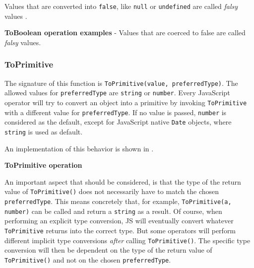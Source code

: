 Values that are converted into \texttt{false}, like \texttt{null} or \texttt{undefined} are called \textit{falsy} values \citep{you-dont-know-js}.

\begin{code}
	\captionsetup{aboveskip=0pt, belowskip=10pt}
	\caption[ToBoolean operation examples]{\textbf{ToBoolean operation examples} - Values that are coerced to false are called \textit{falsy} values.}
	\label{code:background-to-boolean-operation}
\end{code}

\subsubsection{ToPrimitive}
The signature of this function is \texttt{ToPrimitive(value, preferredType)}. The allowed values for \texttt{preferredType} are \texttt{string} or \texttt{number}. Every JavaScript operator will try to convert an object into a primitive by invoking \texttt{ToPrimitive} with a different value for \texttt{preferredType}. If no value is passed, \texttt{number} is considered as the default, except for JavaScript native \texttt{Date} objects, where \texttt{string} is used as default.

An implementation of this behavior is shown in .

\begin{code}
	\captionsetup{aboveskip=0pt, belowskip=10pt}
	\caption[ToPrimitive operation]{\textbf{ToPrimitive operation}}
	\label{code:background-to-primitive-operation}
\end{code}

An important aspect that should be considered, is that the type of the return value of \texttt{ToPrimitive()} does not necessarily have to match the chosen \texttt{preferredType}. This means concretely that, for example, \texttt{ToPrimitive(a, number)} can be called and return a \texttt{string} as a result. Of course, when performing an explicit type conversion, JS will eventually convert whatever \texttt{ToPrimitive} returns into the correct type. But some operators will perform different implicit type conversions \textit{after} calling \texttt{ToPrimitive()}. The specific type conversion will then be dependent on the type of the return value of \texttt{ToPrimitive()} and not on the chosen \texttt{preferredType}.

